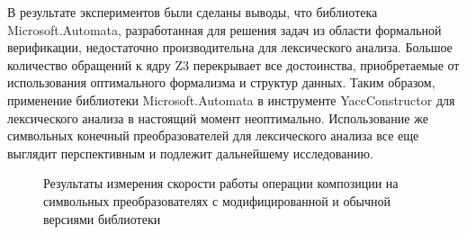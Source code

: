 В результате экспериментов были сделаны выводы, что библиотека Microsoft.Automata, разработанная для решения задач из области формальной верификации, недостаточно производительна для лексического анализа. Большое количество обращений к ядру Z3 перекрывает все достоинства, приобретаемые от использования оптимального формализма и структур данных. Таким образом, применение библиотеки Microsoft.Automata в инструменте YaccConstructor для лексического анализа в настоящий момент неоптимально. 
Использование же символьных конечный преобразователей для лексического анализа все еще выглядит перспективным и подлежит дальнейшему исследованию.

\begin{figure}[H]
\begin{center}
\end{center}
\caption{Результаты измерения скорости работы операции композиции на символьных преобразователях с модифицированной и обычной версиями библиотеки}
\label{graph2}
\end{figure}
